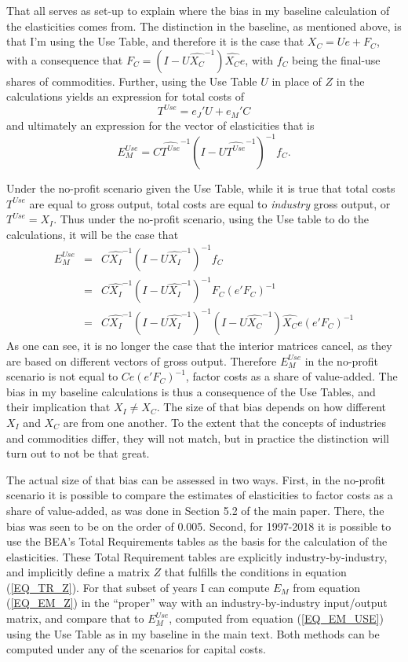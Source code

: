 That all serves as set-up to explain where the bias in my baseline calculation of the elasticities comes from. The distinction in the baseline, as mentioned above, is that I'm using the Use Table, and therefore it is the case that $X_C = Ue +F_C$, with a consequence that $F_C = (I - U\hat{X_C}^{-1})\hat{X_C}e$, with $f_C$ being the final-use shares of commodities. Further, using the Use Table $U$ in place of $Z$ in the calculations yields an expression for total costs of
\begin{equation*}
	T^{Use} = e_J'U + e_M'C
\end{equation*}
and ultimately an expression for the vector of elasticities that is
\begin{equation}
	E_M^{Use} = C\hat{T^{Use}}^{-1} \left(I-U\hat{T^{Use}}^{-1}\right)^{-1}f_C. \label{EQ_EM_USE}
\end{equation}

Under the no-profit scenario given the Use Table, while it is true that total costs $T^{Use}$ are equal to gross output, total costs are equal to \textit{industry} gross output, or $T^{Use} = X_I$. Thus under the no-profit scenario, using the Use table to do the calculations, it will be the case that
\begin{eqnarray*}
	E_M^{Use} &=& C\hat{X_I}^{-1} \left(I-U\hat{X_I}^{-1}\right)^{-1}f_C \\
				&=& C\hat{X_I}^{-1} \left(I-U\hat{X_I}^{-1}\right)^{-1} F_C (e'F_C)^{-1} \\
				&=& C\hat{X_I}^{-1} \left(I-U\hat{X_I}^{-1}\right)^{-1}(I - U\hat{X_C}^{-1})\hat{X_C}e (e'F_C)^{-1}
\end{eqnarray*}
As one can see, it is no longer the case that the interior matrices cancel, as they are based on different vectors of gross output. Therefore $E_M^{Use}$ in the no-profit scenario is not equal to $Ce(e'F_C)^{-1}$, factor costs as a share of value-added. The bias in my baseline calculations is thus a consequence of the Use Tables, and their implication that $X_I \neq X_C$. The size of that bias depends on how different $X_I$ and $X_C$ are from one another. To the extent that the concepts of industries and commodities differ, they will not match, but in practice the distinction will turn out to not be that great.

The actual size of that bias can be assessed in two ways. First, in the no-profit scenario it is possible to compare the estimates of elasticities to factor costs as a share of value-added, as was done in Section 5.2 of the main paper. There, the bias was seen to be on the order of 0.005. Second, for 1997-2018 it is possible to use the BEA's Total Requirements tables as the basis for the calculation of the elasticities. These Total Requirement tables are explicitly industry-by-industry, and implicitly define a matrix $Z$ that fulfills the conditions in equation (\ref{EQ_TR_Z}). For that subset of years I can compute $E_M$ from equation (\ref{EQ_EM_Z}) in the ``proper'' way with an industry-by-industry input/output matrix, and compare that to $E_M^{Use}$, computed from equation (\ref{EQ_EM_USE}) using the Use Table as in my baseline in the main text. Both methods can be computed under any of the scenarios for capital costs.

